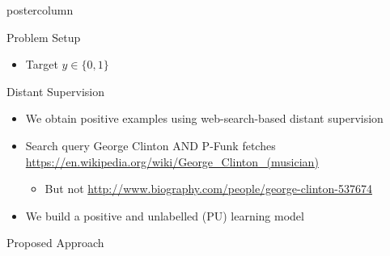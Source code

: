 \documentclass{beamer}
\begin{document}
\begin{frame}
\begin{columns}
\begin{column}{.5\textwidth}
\begin{beamercolorbox}[center]{postercolumn}
\begin{minipage}{.98\textwidth}
{\begin{myblock}{Problem Setup}
\begin{itemize}
\begin{itemize}
\item Target $y \in \{0,1\}$ 
	\end{itemize}     		
	\end{itemize}     		
    				\end{myblock}\vfill
					\begin{myblock}{Distant Supervision}

\vspace{0.5em}

              \begin{itemize}
		\item  We obtain positive examples using web-search-based distant supervision
		\item  Search query {\color{gray} George Clinton AND P-Funk} fetches {\small \color{blue} \url{https://en.wikipedia.org/wiki/George_Clinton_(musician)}}
		\begin{itemize}
		\item But not {\small \color{blue} \url{http://www.biography.com/people/george-clinton-537674}}
     \end{itemize}     
		\item  We build a positive and unlabelled (PU) learning model
     \end{itemize}     
						\vspace{0.5em}
			
					\end{myblock}\vfill
					\begin{myblock}{Proposed Approach}


\end{myblock}}
\end{minipage}
\end{beamercolorbox}
\end{column}
\end{columns}
\end{frame}
\end{document}
